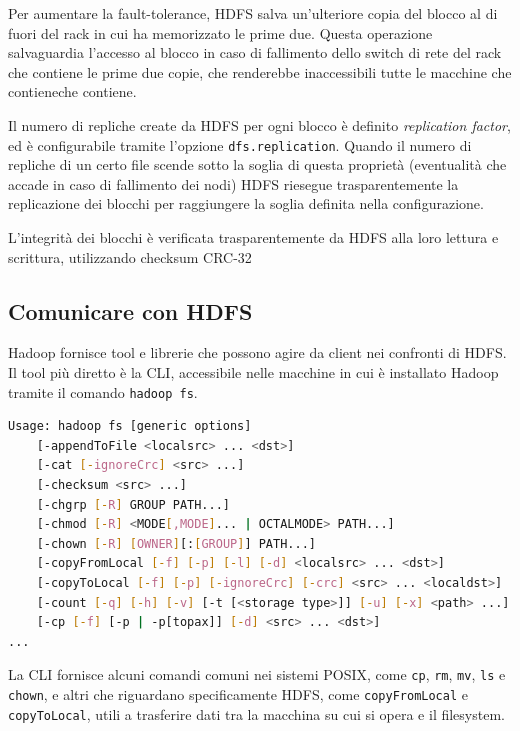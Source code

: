 \documentclass[italian,a4paper, twoside, 12pt]{report}
\begin{document}
Per aumentare la fault-tolerance, HDFS salva un'ulteriore copia del
blocco al di fuori del rack in cui ha memorizzato le prime due. Questa
operazione salvaguardia l'accesso al blocco in caso di fallimento dello
switch di rete del rack che contiene le prime due copie, che renderebbe
inaccessibili tutte le macchine che contieneche contiene.

Il numero di repliche create da HDFS per ogni blocco è definito
\emph{replication factor}, ed è configurabile tramite l'opzione
\lstinline!dfs.replication!. Quando il numero di repliche di un certo
file scende sotto la soglia di questa proprietà (eventualità che accade
in caso di fallimento dei nodi) HDFS riesegue trasparentemente la
replicazione dei blocchi per raggiungere la soglia definita nella
configurazione.

L'integrità dei blocchi è verificata trasparentemente da HDFS alla loro
lettura e scrittura, utilizzando checksum
CRC-32\textbar{}\textbar{}\textbar{}

\subsection{Comunicare con HDFS}\label{comunicare-con-hdfs}

Hadoop fornisce tool e librerie che possono agire da client nei
confronti di HDFS. Il tool più diretto è la CLI, accessibile nelle
macchine in cui è installato Hadoop tramite il comando
\lstinline!hadoop fs!.

\begin{lstlisting}[language=sh]
% hadoop fs -help
Usage: hadoop fs [generic options]
    [-appendToFile <localsrc> ... <dst>]
    [-cat [-ignoreCrc] <src> ...]
    [-checksum <src> ...]
    [-chgrp [-R] GROUP PATH...]
    [-chmod [-R] <MODE[,MODE]... | OCTALMODE> PATH...]
    [-chown [-R] [OWNER][:[GROUP]] PATH...]
    [-copyFromLocal [-f] [-p] [-l] [-d] <localsrc> ... <dst>]
    [-copyToLocal [-f] [-p] [-ignoreCrc] [-crc] <src> ... <localdst>]
    [-count [-q] [-h] [-v] [-t [<storage type>]] [-u] [-x] <path> ...]
    [-cp [-f] [-p | -p[topax]] [-d] <src> ... <dst>]
...
\end{lstlisting}

La CLI fornisce alcuni comandi comuni nei sistemi POSIX, come
\lstinline!cp!, \lstinline!rm!, \lstinline!mv!, \lstinline!ls! e
\lstinline!chown!, e altri che riguardano specificamente HDFS, come
\lstinline!copyFromLocal! e \lstinline!copyToLocal!, utili a trasferire
dati tra la macchina su cui si opera e il filesystem.
\end{document}
